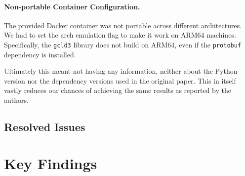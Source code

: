 \documentclass[manuscript]{acmart}
\begin{document}
\paragraph{Non-portable Container Configuration.} The provided Docker container was not portable across different architectures. We had to set the arch emulation flag to make it work on ARM64 machines. Specifically, the \texttt{gcld3} library does not build on ARM64, even if the \texttt{protobuf} dependency is installed.

Ultimately this meant not having any information, neither about the Python version nor the dependency versions used in the original paper. This in itself vastly reduces our chances of achieving the same results as reported by the authors.

\subsection{Resolved Issues}









\section{Key Findings}
\end{document}
